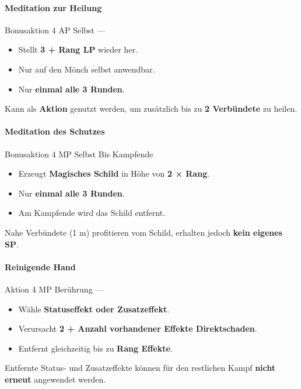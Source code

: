 \paragraph*{Meditation zur Heilung}

\skillcard
{}
{Bonusaktion}
{4 AP}
{Selbst}
{—}
{
	\begin{itemize}
		\item Stellt \textbf{3 + Rang LP} wieder her.
		\item Nur auf den Mönch selbst anwendbar.
		\item Nur \textbf{einmal alle 3 Runden}.
	\end{itemize}
}
{
	Kann als \textbf{Aktion} genutzt werden, um zusätzlich
	bis zu \textbf{2 Verbündete} zu heilen.
}

\paragraph*{Meditation des Schutzes}

\spellcard
{}
{Bonusaktion}
{4 MP}
{Selbst}
{Bis Kampfende}
{
	\begin{itemize}
		\item Erzeugt \textbf{Magisches Schild} in Höhe von \textbf{2 × Rang}.
		\item Nur \textbf{einmal alle 3 Runden}.
		\item Am Kampfende wird das Schild entfernt.
	\end{itemize}
}
{
	Nahe Verbündete (1 m) profitieren vom Schild,
	erhalten jedoch \textbf{kein eigenes SP}.
}

\paragraph*{Reinigende Hand}

\spellcard
{}
{Aktion}
{4 MP}
{Berührung}
{—}
{
	\begin{itemize}
		\item Wähle \textbf{Statuseffekt oder Zusatzeffekt}.
		\item Verursacht \textbf{2 + Anzahl vorhandener Effekte Direktschaden}.
		\item Entfernt gleichzeitig bis zu \textbf{Rang Effekte}.
	\end{itemize}
}
{
	Entfernte Status- und Zusatzeffekte können
	für den restlichen Kampf \textbf{nicht erneut} angewendet werden.
}

